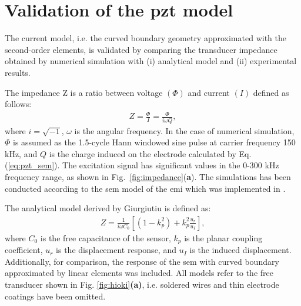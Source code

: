 \section{Validation of the \acs{pzt} model}
\label{sec:pztVal}

The current model, i.e. the curved boundary geometry approximated with the second-order elements, is validated by comparing the transducer impedance obtained by numerical simulation with (i) analytical model and (ii) experimental results.

The impedance Z is a ratio between voltage \((\Phi)\) and current \((I)\) defined as follows:
\begin{eqnarray}
	Z = \frac{\Phi}{I} = \frac{\Phi}{i\omega Q},
	\label{eq:impedance}
\end{eqnarray}
%
%
%
%
where \(i=\sqrt{-1}\), \(\omega\) is the angular frequency.
In the case of numerical simulation, \(\Phi\) is assumed as the 1.5-cycle Hann windowed sine pulse at carrier frequency 150 \unit{\kHz}, and \(Q\) is the charge induced on the electrode calculated by Eq. (\ref{eq:pzt_sem}).
The excitation signal has significant values in the 0-300 \unit{\kHz} frequency range, as shown in Fig.~\ref{fig:impedance}(\textbf{a}).
The simulations has been conducted according to the \ac{sem} model of the \ac{emi} which was implemented in \cite{fiborek2018time}.

The analytical model derived by Giurgiutiu \cite{giurgiutiu2009micromechatronics} is defined as:
\begin{eqnarray}
	Z = \frac{1}{i\omega C_0}\left[\left(1-k_p^2\right)+k_p^2\frac{u_r}{u_I}\right],
\end{eqnarray}
%
%
where \(C_0\) is the free capacitance of the sensor, \(k_p\) is the planar coupling coefficient, \(u_r\) is the displacement response, and \(u_I\) is the induced displacement.
Additionally, for comparison, the response of the \ac{sem} with curved boundary approximated by linear elements was included.
All models refer to the free transducer shown in Fig. \ref{fig:hioki}\textbf{(a)}, i.e. soldered wires and thin electrode coatings have been omitted.

